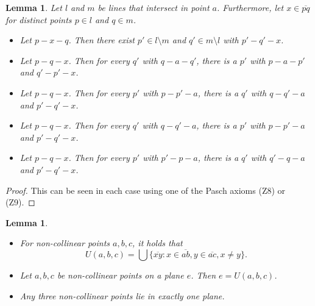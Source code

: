 \documentclass[11pt,a4paper]{article}
\newcommand{\betw}[3]{#1 - #2 - #3}
\newcommand{\lineab}[1]{\overline{#1}}
\newtheorem{lemma}[theorem]{Lemma}
\begin{document}
\begin{lemma} \label{lem:line_intersections_configurations}
Let $l$ and $m$ be lines that intersect in point $a$. Furthermore, let $x \in \lineab{pq}$ for distinct points $p \in l$ and $q \in m$.
\begin{itemize}
    \item[(i)] Let $\betw{p}{x}{q}$. Then there exist $p' \in l \setminus m$ and $q' \in m \setminus l$ with $\betw{p'}{q'}{x}$.
    \item[(ii)] Let $\betw{p}{q}{x}$. Then for every $q'$ with $\betw{q}{a}{q'}$, there is a $p'$ with $\betw{p}{a}{p'}$ and $\betw{q'}{p'}{x}$.
    \item[(iii)] Let $\betw{p}{q}{x}$. Then for every $p'$ with $\betw{p}{p'}{a}$, there is a $q'$ with $\betw{q}{q'}{a}$ and $\betw{p'}{q'}{x}$.
    \item[(iv)] Let $\betw{p}{q}{x}$. Then for every $q'$ with $\betw{q}{q'}{a}$, there is a $p'$ with $\betw{p}{p'}{a}$ and $\betw{p'}{q'}{x}$.
    \item[(v)] Let $\betw{p}{q}{x}$. Then for every $p'$ with $\betw{p'}{p}{a}$, there is a $q'$ with $\betw{q'}{q}{a}$ and $\betw{p'}{q'}{x}$.
\end{itemize}
\end{lemma}

\begin{proof}
This can be seen in each case using one of the Pasch axioms (Z8) or (Z9).
\end{proof}

\begin{lemma} \label{lem:plane_properties}
\begin{itemize}
    \item[(i)] For non-collinear points $a, b, c$, it holds that
    \[ U(a, b, c) = \bigcup \{\lineab{xy} : x \in \lineab{ab}, y \in \lineab{ac}, x \neq y\}. \]
    \item[(ii)] Let $a, b, c$ be non-collinear points on a plane $e$. Then $e = U(a, b, c)$.
    \item[(iii)] Any three non-collinear points lie in exactly one plane.
\end{itemize}
\end{lemma}
\end{document}
